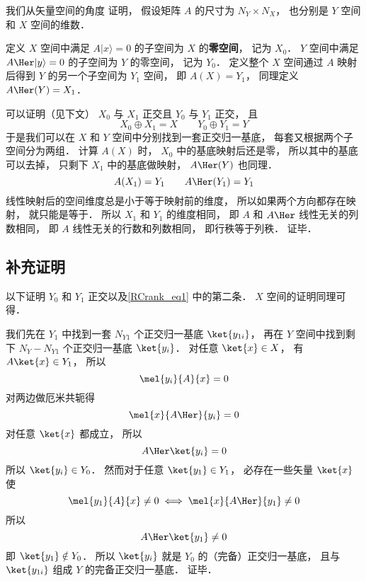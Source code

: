 

我们从矢量空间的角度 证明， 假设矩阵 $A$ 的尺寸为 $N_Y \times N_X$， 也分别是 $Y$ 空间和 $X$ 空间的维数．

定义 $X$ 空间中满足 $A |x\rangle = 0$ 的子空间为 $X$ 的\textbf{零空间}， 记为 $X_0$． $Y$ 空间中满足 $A\Her |y\rangle = 0$ 的子空间为 $Y$ 的零空间， 记为 $Y_0$． 定义整个 $X$ 空间通过 $A$ 映射后得到 $Y$ 的另一个子空间为 $Y_1$ 空间， 即 $A(X) = Y_1$， 同理定义 $A\Her(Y) = X_1$． %

可以证明（见下文） $X_0$ 与 $X_1$ 正交且 $Y_0$ 与 $Y_1$ 正交， 且
\begin{equation}\label{RCrank_eq1}
X_0 \oplus X_1 = X
\qquad
Y_0 \oplus Y_1 = Y
\end{equation}
于是我们可以在 $X$ 和 $Y$ 空间中分别找到一套正交归一基底， 每套又根据两个子空间分为两组． 计算 $A(X)$ 时， $X_0$ 中的基底映射后还是零， 所以其中的基底可以去掉， 只剩下 $X_1$ 中的基底做映射， $A\Her(Y)$ 也同理．
\begin{equation}
A(X_1) = Y_1
\qquad
A\Her(Y_1) = Y_1
\end{equation}
线性映射后的空间维度总是小于等于映射前的维度， 所以如果两个方向都存在映射， 就只能是等于． 所以 $X_1$ 和 $Y_1$ 的维度相同， 即 $A$ 和 $A\Her$ 线性无关的列数相同， 即 $A$ 线性无关的行数和列数相同， 即行秩等于列秩． 证毕．

\subsection{补充证明}
以下证明 $Y_0$ 和 $Y_1$ 正交以及\autoref{RCrank_eq1} 中的第二条． $X$ 空间的证明同理可得．

我们先在 $Y_1$ 中找到一套 $N_{Y1}$ 个正交归一基底 $\ket{y_{1i}}$， 再在 $Y$ 空间中找到剩下 $N_Y - N_{Y1}$ 个正交归一基底 $\ket{y_i}$． 对任意 $\ket{x} \in X$， 有 $A \ket{x} \in Y_1$， 所以
\begin{equation}
\mel{y_i}{A}{x} = 0
\end{equation}
对两边做厄米共轭得%
\begin{equation}
\mel{x}{A\Her}{y_i} = 0
\end{equation}
对任意 $\ket{x}$ 都成立， 所以
\begin{equation}
A\Her\ket{y_i} = 0
\end{equation}
所以 $\ket{y_i} \in Y_0$． 然而对于任意 $\ket{y_1} \in Y_1$， 必存在一些矢量 $\ket{x}$ 使
\begin{equation}
\mel{y_1}{A}{x} \ne 0
\iff
\mel{x}{A\Her}{y_1} \ne 0
\end{equation}
所以
\begin{equation}
A\Her\ket{y_1} \ne 0
\end{equation}
即 $\ket{y_1} \notin Y_0$． 所以 $\ket{y_i}$ 就是 $Y_0$ 的（完备）正交归一基底， 且与 $\ket{y_{1i}}$ 组成 $Y$ 的完备正交归一基底． 证毕．
